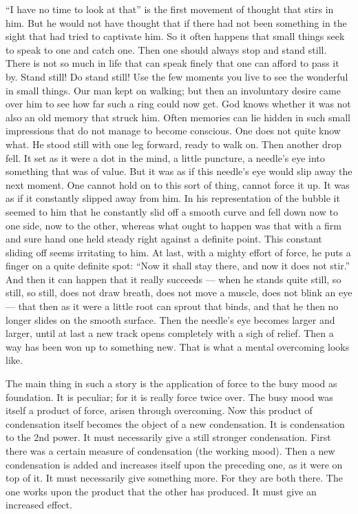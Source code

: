 \documentclass[12pt,a4paper,openany]{book}
\newcommand{\opage}[1]{\marginnote{\footnotesize\textit{[#1]}}}
\begin{document}
``I have no time to look at that'' is the first movement of thought
that stirs in him. But he would not have
thought that if there had not been something in the sight that had
tried to captivate him. So it often happens that small things
seek to speak to one and catch one. Then one should always
stop and stand still. There is not so much in life that can speak
\setcounter{footnote}{0}%
\opage{296}finely that one can afford to pass it by. Stand still! Do
stand still! Use the few moments you live to see
the wonderful in small things. Our man kept on walking;
but then an involuntary desire came over him to see how
far such a ring could now get. God knows whether it
was not also an old memory that struck him. Often
memories can lie hidden in such small impressions that
do not manage to become conscious. One does not quite know what. He
stood still with one leg forward, ready to walk on.
Then another drop fell. It set as it were a dot in the mind,
a little puncture, a needle's eye into something that was of value.
But it was as if this needle's eye would slip away the next moment.
One cannot hold on to this sort of thing, cannot force
it up. It was as if it constantly slipped away from him. In his
representation of the bubble it seemed to him that he constantly slid off
a smooth curve and fell down now to one side, now
to the other, whereas what ought to happen was that with
a firm and sure hand one held steady right against a definite point.
This constant sliding off seems irritating to him.
At last, with a mighty effort of force, he
puts a finger on a quite definite spot: ``Now it shall
stay there, and now it does not stir.'' And then it can happen that it
really succeeds --- when he stands quite still, so still, so
still, does not draw breath, does not move a muscle, does not blink
an eye --- that then as it were a little root can sprout that
binds, and that he then no longer slides on the smooth surface. Then
the needle's eye becomes larger and larger, until at last a new track
opens completely with a sigh of relief. Then a way has been won
up to something new. That is what a mental overcoming looks like.

The main thing in such a story is the application of force
to the busy mood as foundation. It is
peculiar; for it is really force twice over. The busy mood was itself a product of force, arisen through
overcoming. Now this product of condensation itself becomes the object
of a new condensation. It is condensation to the 2nd power.
\setcounter{footnote}{0}%
\opage{297}It must necessarily give a still stronger condensation. First
there was a certain measure of condensation (the working mood). Then
a new condensation is added and increases itself upon the preceding one,
as it were on top of it. It must necessarily give something more.
For they are both there. The one works upon the product that the
other has produced. It must give an increased effect.
\end{document}
